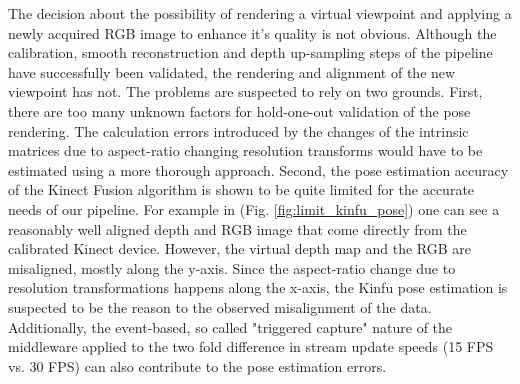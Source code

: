 \documentclass{ucl_thesis}
\newcommand{\figref}[1]{(Fig. \ref{#1})}
\begin{document}
\par The decision about the possibility of rendering a virtual viewpoint and applying a newly acquired RGB image to enhance it's quality is not obvious. Although the calibration, smooth reconstruction and depth up-sampling steps of the pipeline have successfully been validated, the rendering and alignment of the new viewpoint has not. The problems are suspected to rely on two grounds. First, there are too many unknown factors for hold-one-out validation of the pose rendering. The calculation errors introduced by the changes of the intrinsic matrices due to aspect-ratio changing resolution transforms would have to be estimated using a more thorough approach. Second, the pose estimation accuracy of the Kinect Fusion algorithm is shown to be quite limited for the accurate needs of our pipeline. For example in \figref{fig:limit_kinfu_pose} one can see a reasonably well aligned depth and RGB image that come directly from the calibrated Kinect device. However, the virtual depth map and the RGB are misaligned, mostly along the y-axis. Since the aspect-ratio change due to resolution transformations happens along the x-axis, the Kinfu pose estimation is suspected to be the reason to the observed misalignment of the data. Additionally, the event-based, so called "triggered capture" nature of the middleware applied to the two fold difference in stream update speeds (15 FPS vs. 30 FPS) can also contribute to the pose estimation errors.
\end{document}
